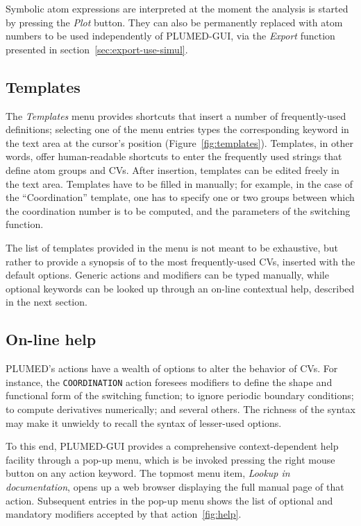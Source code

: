 \documentclass[preprint,review,11pt]{elsarticle}
\begin{document}
Symbolic atom expressions are interpreted at the moment the analysis is
started by pressing the \emph{Plot} button. They can also be
permanently replaced with atom numbers to be used independently of PLUMED-GUI, via the
\emph{Export} function presented in section~\ref{sec:export-use-simul}.



\subsection{Templates}

The \emph{Templates} menu provides shortcuts that insert a number of
frequently-used definitions; selecting one of the menu entries types
the corresponding keyword in the text area at the cursor's position
(Figure~\ref{fig:templates}). Templates, in other words, offer
human-readable shortcuts to enter the frequently used strings that
define atom groups and CVs. After insertion, templates can be edited
freely in the text area.
Templates have to be filled in  manually; for example, in the
case of the ``Coordination'' template, one has to specify one or two
groups between which the coordination number is to be computed, and
the parameters of the switching function.

The list of templates provided in the menu is not meant to be
exhaustive, but rather to provide a synopsis of to the most
frequently-used CVs, inserted with the default options. Generic
actions and modifiers can be typed manually, while optional keywords
can be looked up through an on-line contextual help, described
in the next section.


\subsection{On-line help}

PLUMED's actions have a wealth of options to alter the
behavior of CVs. For instance, the \texttt{COORDINATION} action
foresees modifiers to define the shape and functional form of the
switching function; to ignore periodic boundary conditions; to compute
derivatives numerically; and several others. The richness of the
syntax may make it unwieldy to recall the syntax of lesser-used
options.


To this end, PLUMED-GUI provides a comprehensive context-dependent help facility
through a pop-up menu, which is be invoked pressing the right mouse
button on any action keyword. The topmost menu item, \emph{Lookup in
  documentation}, opens up a web browser displaying the full manual
page of that action.  Subsequent entries in the pop-up menu shows the
list of optional and mandatory modifiers accepted by that
action~\ref{fig:help}.
\end{document}
